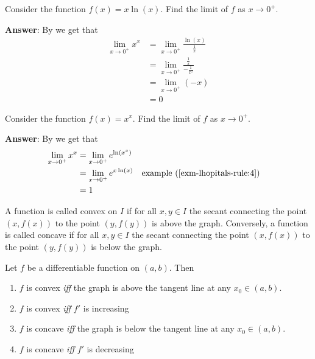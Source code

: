 \begin{exm}\label{exm-lhopitals-rule:4}
	Consider the function $f(x)=x\ln(x)$. Find the limit of $f$ as $x\to0^+$.
	\begin{flushleft}
		\textbf{Answer}: By  we get that
		\begin{align*}
			\lim_{x\to0^+}x^x & = \lim_{x\to0^+}\frac{\ln(x)}{\frac{1}{x}}         \\
			                  & = \lim_{x\to0^+}\frac{\frac{1}{x}}{-\frac{1}{x^2}} \\
			                  & = \lim_{x\to0^+}\left(-x\right)                    \\
			                  & = 0
		\end{align*}
	\end{flushleft}
\end{exm}

\begin{exm}\label{exm-lhopitals-rule:5}
	Consider the function $f(x)=x^x$. Find the limit of $f$ as $x\to0^+$.
	\begin{flushleft}
		\textbf{Answer}: By  we get that
		\begin{align*}
			\lim_{x\to0^+}x^x & = \lim_{x\to0^+}e^{\ln\left(x^x\right)}                                                  \\
			                  & = \lim_{x\to0^+}e^{x\ln(x)}             &  & \text{example (\ref{exm-lhopitals-rule:4})} \\
			                  & = 1
		\end{align*}
	\end{flushleft}
\end{exm}

\begin{definition}\label{def-convex-concave-functions}
	A function is called convex on $I$ if for all $x,y\in I$ the secant connecting
	the point $(x,f(x))$ to the point $(y,f(y))$ is above the graph. Conversely,
	a function is called concave if for all $x,y\in I$ the secant connecting
	the point $(x,f(x))$ to the point $(y,f(y))$ is below the graph.
\end{definition}

\begin{thm}\label{thm-convex-concave-first-derivative}
	Let $f$ be a differentiable function on $(a,b)$. Then
	\begin{enumerate}
		\item $f$ is convex \textit{iff} the graph is above the tangent line at any $x_0\in(a,b)$.
		\item $f$ is convex \textit{iff} $f'$ is increasing
		\item $f$ is concave \textit{iff} the graph is below the tangent line at any $x_0\in(a,b)$.
		\item $f$ is concave \textit{iff} $f'$ is decreasing
	\end{enumerate}
\end{thm}

